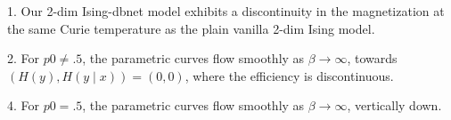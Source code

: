 1. Our 2-dim Ising-dbnet model exhibits a discontinuity in the magnetization at the same Curie temperature as the plain vanilla 2-dim Ising model.

2. For $p0\neq .5$, the parametric curves flow smoothly as $\beta\rightarrow \infty$, towards $(H(y), H(y\mid x))=(0,0)$, where the efficiency is discontinuous.

4. For $p0=.5$, the parametric curves flow smoothly as $\beta\rightarrow \infty$, vertically down.